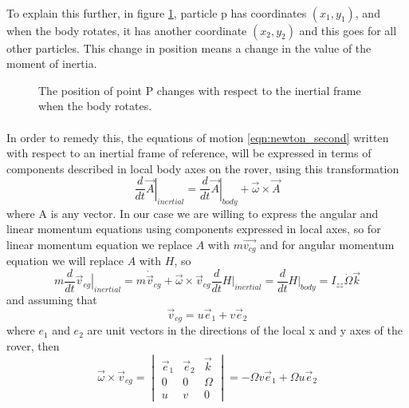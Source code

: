 \documentclass{article}
\begin{document}
	\paragraph{}To explain this further, in figure \ref{fig:rotate}, particle p has coordinates $(x_1,y_1)$, and when the body rotates, it has another coordinate $(x_2,y_2)$ and this goes for all other particles. This change in position means a change in the value of the moment of inertia. 
	\begin{figure}[H]
		\centering
		\def\svgwidth{200pt}
		
		\caption{The position of point P changes with respect to the inertial frame when the body rotates.}
		\label{fig:rotate}
	\end{figure}
	\paragraph{}In order to remedy this, the equations of motion \ref{eqn:newton_second} written with respect to an inertial frame of reference, will be expressed in terms of components described in local body axes on the rover, using this transformation
	\begin{equation}
		\frac{d}{dt}\left.\vec{A}\right|_{inertial} = \frac{d}{dt}\left.\vec{A}\right|_{body} +\vec{\omega}\times\vec{A}
	\end{equation}
	where A is any vector. In our case we are willing to express the angular and linear momentum equations using components expressed in local axes, so for linear momentum equation we replace $A$ with $m\vec{v_{cg}}$ and for angular momentum equation we will replace $A$ with $H$, so
	\begin{subequations}
		\begin{equation}
		m\frac{d}{dt}\left.\vec{v}_{cg}\right|_{inertial} = m\dot{\vec{v}}_{cg} + \vec{\omega}\times\vec{v}_{cg}	
		\end{equation}
		\begin{equation}
		\frac{d}{dt}\left.H\right|_{inertial} = \frac{d}{dt}\left.H\right|_{body} = I_{zz}\dot{\Omega}\vec{k}
		\end{equation}
	\end{subequations}
	and assuming that 
	\[\vec{v}_{cg} = u\vec{e}_1+v\vec{e}_2
	\]
	where $e_1$ and $e_2$ are unit vectors in the directions of the local x and y axes of the rover, then 
	\[\vec{\omega}\times\vec{v}_{cg} = \begin{vmatrix}
	\vec{e}_1 &\vec{e}_2&\vec{k}\\0& 0& \Omega\\u& v& 0
	\end{vmatrix} = -\Omega v\vec{e}_1 +\Omega u\vec{e}_2
	\]
\end{document}
